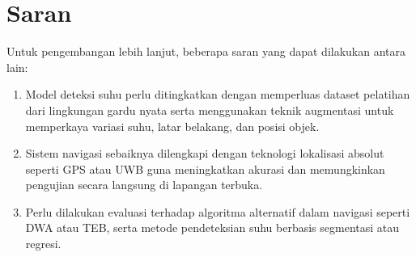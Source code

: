 \section{Saran}
\label{sec:saran}

Untuk pengembangan lebih lanjut, beberapa saran yang dapat dilakukan antara lain:

\begin{enumerate}[nolistsep]
    \item Model deteksi suhu perlu ditingkatkan dengan memperluas dataset pelatihan dari lingkungan gardu nyata serta menggunakan teknik augmentasi untuk memperkaya variasi suhu, latar belakang, dan posisi objek.

    \item Sistem navigasi sebaiknya dilengkapi dengan teknologi lokalisasi absolut seperti GPS atau UWB guna meningkatkan akurasi dan memungkinkan pengujian secara langsung di lapangan terbuka.

    \item Perlu dilakukan evaluasi terhadap algoritma alternatif dalam navigasi seperti DWA atau TEB, serta metode pendeteksian suhu berbasis segmentasi atau regresi.
\end{enumerate}
